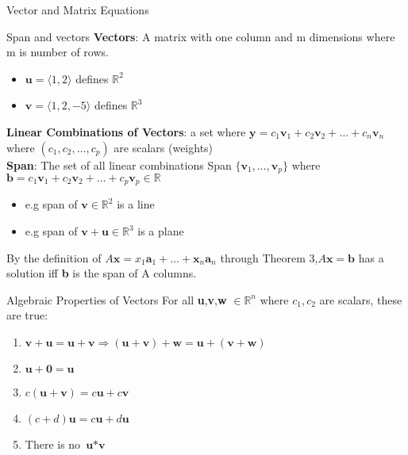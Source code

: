 \documentclass[a4paper, 12pt]{article}
\begin{document}
\begin{section}{Vector and Matrix Equations}
\begin{subsection}{Span and vectors}
\textbf{Vectors}: A matrix with one column and m dimensions
where m is number of rows.
\begin{itemize}
	\item{$\textbf{u}=\langle1,2\rangle$ 
	defines $\mathbb{R}^2$}
\item{$\textbf{v}=\langle1,2,-5\rangle$ defines $\mathbb{R}^3$}
\end{itemize}
\textbf{Linear Combinations of Vectors}: a set where 
$\textbf{y}=c_1\textbf{v}_1+c_2\textbf{v}_2+\dots+c_n\textbf{v}_n$
where $(c_1,c_2,\dots,c_p)$ are scalars (weights)\\

\noindent\textbf{Span}: The set of all linear combinations Span
$\lbrace \textbf{v}_1 , \dots , \textbf{v}_p \rbrace$ where 
$\textbf{b}=c_1\textbf{v}_1+c_2\textbf{v}_2+\dots+
c_p\textbf{v}_p \in \mathbb{R}$
\begin{itemize}
	\item{e.g span of $\textbf{v} \in \mathbb{R}^2$ is a line}
	\item{e.g span of $\textbf{v}+\textbf{u} 
	\in \mathbb{R}^3$ is a plane}
\end{itemize}
By the definition of 
$A \textbf{x}=x_1 \textbf{a}_1+\dots + \textbf{x}_n \textbf{a}_n$ 
through Theorem 3,$A\textbf{x}=\textbf{b}$ has a solution iff 
\textbf{b} is the span of A columns.
\end{subsection}
\begin{subsection}{Algebraic Properties of Vectors}
	For all \textbf{u},\textbf{v},\textbf{w} $\in \mathbb{R}^n$
	where $c_1 , c_2$ are scalars, these are true:
\begin{enumerate}
	\item{$\textbf{v}+\textbf{u}=\textbf{u}+\textbf{v}
	\Rightarrow (\textbf{u}+\textbf{v})+\textbf{w}=
\textbf{u}+(\textbf{v}+\textbf{w})$}
\item{$\textbf{u}+\textbf{0}=\textbf{u}$}
\item{$c(\textbf{u}+\textbf{v})=c\textbf{u}+c\textbf{v}$}
\item{$(c+d)\textbf{u}=c\textbf{u}+d\textbf{u}$}
\item{There is no $\textbf{u}*\textbf{v}$}
\end{enumerate}
\end{subsection}
\end{section}
\end{document}
